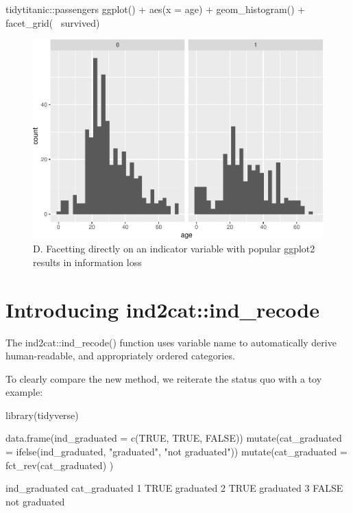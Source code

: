 \begin{Schunk}
\begin{Sinput}
tidytitanic::passengers %
ggplot() + 
  aes(x = age) + 
  geom_histogram() + 
  facet_grid(~ survived)
\end{Sinput}
\begin{figure}
\includegraphics[width=0.69\linewidth]{r_journal_files/figure-latex/direct_visual_loss-1} \caption[D]{D. Facetting directly on an indicator variable with popular ggplot2 results in information loss}\label{fig:direct_visual_loss}
\end{figure}
\end{Schunk}

\hypertarget{introducing-ind2catind_recode}{%
\section{Introducing
ind2cat::ind\_recode}\label{introducing-ind2catind_recode}}

The ind2cat::ind\_recode() function uses variable name to automatically
derive human-readable, and appropriately ordered categories.

To clearly compare the new method, we reiterate the status quo with a
toy example:

\begin{Schunk}
\begin{Sinput}
library(tidyverse)

data.frame(ind_graduated = 
             c(TRUE, TRUE, FALSE))  %
  mutate(cat_graduated  = 
           ifelse(ind_graduated, 
                  "graduated", 
                  "not graduated"))  %
  mutate(cat_graduated = 
           fct_rev(cat_graduated)
         )  
\end{Sinput}
\begin{Soutput}
       ind_graduated cat_graduated
     1          TRUE     graduated
     2          TRUE     graduated
     3         FALSE not graduated
\end{Soutput}
\end{Schunk}

